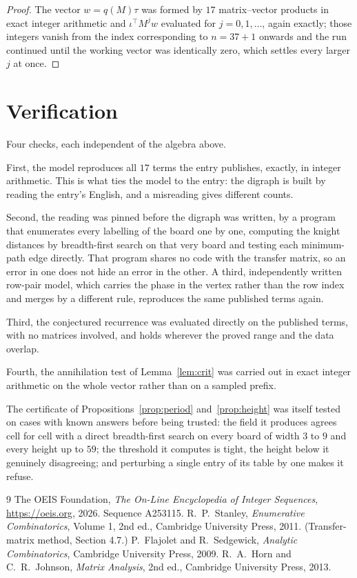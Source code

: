 \documentclass[11pt,a4paper]{article}
\theoremstyle{plain}
\theoremstyle{definition}
\begin{document}
\begin{proof}
The vector $w=q(M)\tau$ was formed by $17$ matrix--vector products in exact integer
arithmetic and $\iota^{\!\top}M^{j}w$ evaluated for $j=0,1,\dots$, again exactly; those
integers vanish from the index corresponding to $n=37+1$ onwards and the run continued
until the working vector was identically zero, which settles every larger $j$ at once.
\end{proof}

\section{Verification}

Four checks, each independent of the algebra above.

First, the model reproduces all $17$ terms the entry publishes, exactly, in integer
arithmetic. This is what ties the model to the entry: the digraph is built by reading the
entry's English, and a misreading gives different counts.

Second, the reading was pinned before the digraph was written, by a program that enumerates
every labelling of the board one by one, computing the knight distances by breadth-first
search on that very board and testing each minimum-path edge directly. That program shares no
code with the transfer matrix, so an error in one does not hide an error in the other. A
third, independently written row-pair model, which carries the phase in the vertex rather than
the row index and merges by a different rule, reproduces the same published terms again.

Third, the conjectured recurrence was evaluated directly on the published terms, with no
matrices involved, and holds wherever the proved range and the data overlap.

Fourth, the annihilation test of Lemma~\ref{lem:crit} was carried out in exact integer
arithmetic on the whole vector rather than on a sampled prefix.

The certificate of Propositions~\ref{prop:period} and~\ref{prop:height} was itself tested
on cases with known answers before being trusted: the field it produces agrees cell for cell
with a direct breadth-first search on every board of width $3$ to $9$ and every height up to
$59$; the threshold it computes is tight, the height below it genuinely disagreeing; and
perturbing a single entry of its table by one makes it refuse.

\begin{thebibliography}{9}
 The OEIS Foundation, \emph{The On-Line Encyclopedia of Integer
Sequences}, \url{https://oeis.org}, 2026. Sequence A253115.
 R.~P.~Stanley, \emph{Enumerative Combinatorics}, Volume 1, 2nd ed.,
Cambridge University Press, 2011. (Transfer-matrix method, Section 4.7.)
 P.~Flajolet and R.~Sedgewick, \emph{Analytic Combinatorics}, Cambridge
University Press, 2009.
 R.~A.~Horn and C.~R.~Johnson, \emph{Matrix Analysis}, 2nd ed., Cambridge
University Press, 2013.
\end{thebibliography}
\end{document}

